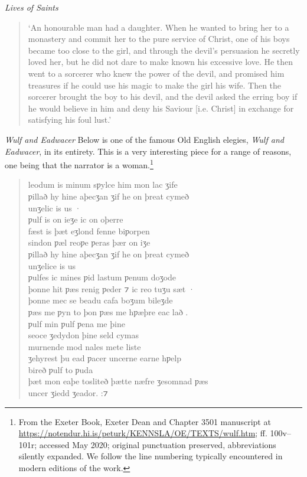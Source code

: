 \begin{texts}{\textit{Lives of Saints}}
\begin{quote}
    \trans `An honourable man had a daughter. When he wanted to bring her to a monastery and commit her to the pure service of Christ, one of his boys became too close to the girl, and through the devil's persuasion he secretly loved her, but he did not dare to make known his excessive love. He then went to a sorcerer who knew the power of the devil, and promised him treasures if he could use his magic to make the girl his wife. Then the sorcerer brought the boy to his devil, and the devil asked the erring boy if he would believe in him and deny his Saviour [i.e. Christ] in exchange for satisfying his foul lust.'
\end{quote}



\end{texts}

\begin{texts}{\textit{Wulf and Eadwacer}}\label{OE-wulf}
Below is one of the famous Old English elegies, \textit{Wulf and Eadwacer}, in its entirety. This is a very interesting piece for a range of reasons, one being that the narrator is a woman.\footnote{From the Exeter Book, Exeter Dean and Chapter 3501 manuscript at \url{https://notendur.hi.is/peturk/KENNSLA/OE/TEXTS/wulf.htm}; ff. 100v--101r; accessed May 2020; original punctuation preserved, abbreviations silently expanded. We follow the line numbering typically encountered in modern editions of the work.}

\begin{quote}
    \internallinenumbers*{}
    leodum is minum sƿylce him mon lac ʒife\\
    ƿillað hy hine aþecʒan ʒif he on þreat cymeð\\
    unʒelic is us ·\\
    ƿulf is on ieʒe ic on oþerre\\
    fæst is þæt eʒlond fenne biƿorpen\\
    sindon ƿæl reoƿe ƿeras þær on iʒe\\
    ƿillað hy hine aþecʒan ʒif he on þreat cymeð\\
    unʒelice is us\\
    ƿulfes ic mines ƿid lastum ƿenum doʒode\\
    þonne hit ƿæs renig   ƿeder ⁊ ic reo tuʒu sæt ·\\
    þonne mec se beadu cafa   boʒum bileʒde\\
    ƿæs me ƿyn to þon ƿæs me hƿæþre eac lað .\\
    ƿulf min ƿulf ƿena me þine\\
    seoce ʒedydon þine seld cymas\\
    murnende mod nales mete liste\\
    ʒehyrest þu ead ƿacer uncerne earne hƿelp\\
    bireð ƿulf to ƿuda\\
    þæt mon eaþe tosliteð þætte næfre ʒesomnad ƿæs\\
    uncer ʒiedd ʒeador. :⁊
\end{quote}




\end{texts}
